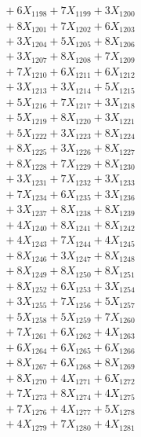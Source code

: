 \documentclass[a4paper,10pt]{article}
\begin{document}
{\begin{align}
&\;  + 6 X_{1198} + 7 X_{1199} + 3 X_{1200} \\[0.3ex]
&\;  + 8 X_{1201} + 7 X_{1202} + 6 X_{1203} \\[0.3ex]
&\;  + 3 X_{1204} + 5 X_{1205} + 8 X_{1206} \\[0.3ex]
&\;  + 3 X_{1207} + 8 X_{1208} + 7 X_{1209} \\[0.5ex]\allowbreak
&\;  + 7 X_{1210} + 6 X_{1211} + 6 X_{1212} \\[0.3ex]
&\;  + 3 X_{1213} + 3 X_{1214} + 5 X_{1215} \\[0.3ex]
&\;  + 5 X_{1216} + 7 X_{1217} + 3 X_{1218} \\[0.3ex]
&\;  + 5 X_{1219} + 8 X_{1220} + 3 X_{1221} \\[0.3ex]
&\;  + 5 X_{1222} + 3 X_{1223} + 8 X_{1224} \\[0.3ex]
&\;  + 8 X_{1225} + 3 X_{1226} + 8 X_{1227} \\[0.3ex]
&\;  + 8 X_{1228} + 7 X_{1229} + 8 X_{1230} \\[0.3ex]
&\;  + 3 X_{1231} + 7 X_{1232} + 3 X_{1233} \\[0.3ex]
&\;  + 7 X_{1234} + 6 X_{1235} + 3 X_{1236} \\[0.3ex]
&\;  + 3 X_{1237} + 8 X_{1238} + 8 X_{1239} \\[0.5ex]\allowbreak
&\;  + 4 X_{1240} + 8 X_{1241} + 8 X_{1242} \\[0.3ex]
&\;  + 4 X_{1243} + 7 X_{1244} + 4 X_{1245} \\[0.3ex]
&\;  + 8 X_{1246} + 3 X_{1247} + 8 X_{1248} \\[0.3ex]
&\;  + 8 X_{1249} + 8 X_{1250} + 8 X_{1251} \\[0.3ex]
&\;  + 8 X_{1252} + 6 X_{1253} + 3 X_{1254} \\[0.3ex]
&\;  + 3 X_{1255} + 7 X_{1256} + 5 X_{1257} \\[0.3ex]
&\;  + 5 X_{1258} + 5 X_{1259} + 7 X_{1260} \\[0.3ex]
&\;  + 7 X_{1261} + 6 X_{1262} + 4 X_{1263} \\[0.3ex]
&\;  + 6 X_{1264} + 6 X_{1265} + 6 X_{1266} \\[0.3ex]
&\;  + 8 X_{1267} + 6 X_{1268} + 8 X_{1269} \\[0.5ex]\allowbreak
&\;  + 8 X_{1270} + 4 X_{1271} + 6 X_{1272} \\[0.3ex]
&\;  + 7 X_{1273} + 8 X_{1274} + 4 X_{1275} \\[0.3ex]
&\;  + 7 X_{1276} + 4 X_{1277} + 5 X_{1278} \\[0.3ex]
&\;  + 4 X_{1279} + 7 X_{1280} + 4 X_{1281} \\[0.3ex]

\end{align}}
\end{document}
